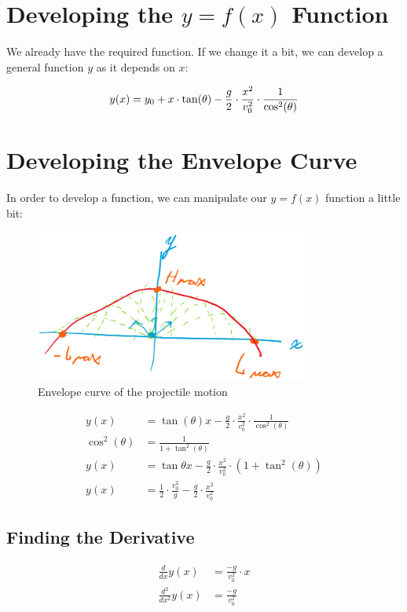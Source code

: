 \newpage
\thispagestyle{plain}

\section{Developing the $y = f(x)$ Function}

We already have the required function. If we change it a bit, we can develop a general function $y$ as it depends on $x$:

\begin{equation}
    y(x) = y_0 + x \cdot \tan(\theta) - \frac{g}{2} \cdot \frac{x^2}{v_0^2} \cdot \frac{1}{\cos^2(\theta)} \\
\end{equation}

\section{Developing the Envelope Curve}
In order to develop a function, we can manipulate our $y = f(x)$ function a little bit: 

\begin{figure}[hbtp]
    \centering
    \includegraphics[width=0.8\textwidth]{./assets/envelope.png}
    \caption{Envelope curve of the projectile motion}
    \label{fig:envelope-curve}
\end{figure}

\begin{align*}
    y(x) &= \tan(\theta)x - \frac{g}{2} \cdot \frac{x^2}{v_0^2} \cdot \frac{1}{\cos^2(\theta)} \\
    \cos^2(\theta) &= \frac{1}{1 + \tan^2(\theta)} \\
    y(x) &= \tan\theta x - \frac{g}{2} \cdot \frac{x^2}{v_0^2} \cdot (1 + \tan^2(\theta)) \\
    y(x) &= \frac{1}{2} \cdot \frac{v_0^2}{g} - \frac{g}{2} \cdot \frac{x^2}{v_0^2}
\end{align*}

\subsection{Finding the Derivative}

\begin{align*}
    \frac{d}{dx} y(x) &= \frac{-g}{v_0^2} \cdot x \\
    \frac{d^2}{dx^2} y(x) &= \frac{-g}{v_0^2} \\
\end{align*}
